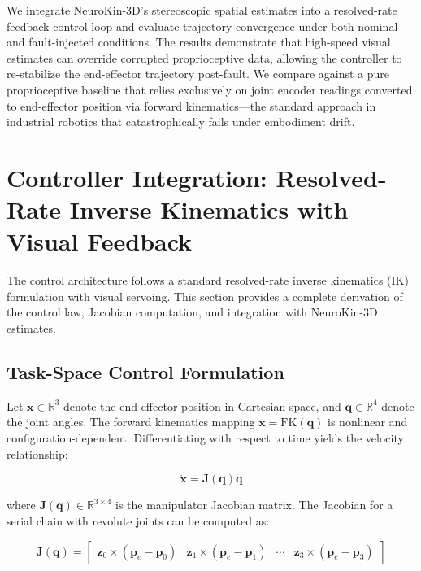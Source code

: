 ﻿\documentclass[12pt,a4paper,oneside]{report}
\begin{document}
We integrate NeuroKin-3D's stereoscopic spatial estimates into a resolved-rate feedback control loop and evaluate trajectory convergence under both nominal and fault-injected conditions. The results demonstrate that high-speed visual estimates can override corrupted proprioceptive data, allowing the controller to re-stabilize the end-effector trajectory post-fault. We compare against a pure proprioceptive baseline that relies exclusively on joint encoder readings converted to end-effector position via forward kinematics---the standard approach in industrial robotics that catastrophically fails under embodiment drift.

\section{Controller Integration: Resolved-Rate Inverse Kinematics with Visual Feedback}

The control architecture follows a standard resolved-rate inverse kinematics (IK) formulation with visual servoing. This section provides a complete derivation of the control law, Jacobian computation, and integration with NeuroKin-3D estimates.

\subsection{Task-Space Control Formulation}

Let $\mathbf{x} \in \mathbb{R}^3$ denote the end-effector position in Cartesian space, and $\mathbf{q} \in \mathbb{R}^4$ denote the joint angles. The forward kinematics mapping $\mathbf{x} = \text{FK}(\mathbf{q})$ is nonlinear and configuration-dependent. Differentiating with respect to time yields the velocity relationship:

\begin{equation}
\dot{\mathbf{x}} = \mathbf{J}(\mathbf{q}) \dot{\mathbf{q}}
\end{equation}

where $\mathbf{J}(\mathbf{q}) \in \mathbb{R}^{3 \times 4}$ is the manipulator Jacobian matrix. The Jacobian for a serial chain with revolute joints can be computed as:

\begin{equation}
\mathbf{J}(\mathbf{q}) = \begin{bmatrix}
\mathbf{z}_0 \times (\mathbf{p}_e - \mathbf{p}_0) & \mathbf{z}_1 \times (\mathbf{p}_e - \mathbf{p}_1) & \cdots & \mathbf{z}_3 \times (\mathbf{p}_e - \mathbf{p}_3)
\end{bmatrix}
\end{equation}
\end{document}

